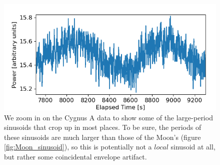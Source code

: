 \documentclass[12pt]{article}
\begin{document}
\begin{figure}
	\centering
	\includegraphics[width=.6\linewidth]{sinusoid/CygnusA}
	\caption{We zoom in on the Cygnus A data to show some of the large-period sinusoids that crop up in most places. To be sure, the periods of these sinusoids are much larger than those of the Moon's (figure \ref{fig:Moon_sinusoid}), so this is potentially not a $local$ sinusoid at all, but rather some coincidental envelope artifact.}
	\label{fig:Cyg_sinusoid}
\end{figure}
\end{document}
